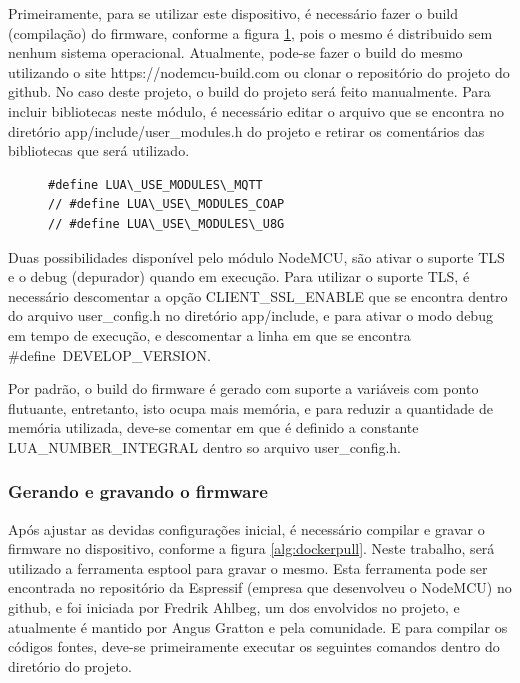 \documentclass[journal]{IEEEtran}
\begin{document}
Primeiramente, para se utilizar este dispositivo, é necessário fazer o build (compilação) do firmware, conforme a figura \ref{alg:modulesh}, pois o mesmo é distribuido sem nenhum sistema operacional. Atualmente, pode-se fazer o build do mesmo utilizando o site https://nodemcu-build.com ou clonar o repositório do projeto do github. No caso deste projeto, o build do projeto será feito manualmente. Para incluir bibliotecas neste módulo, é necessário editar o arquivo que se encontra no diretório app/include/user\_modules.h do projeto e retirar os comentários das bibliotecas que será utilizado.

\begin{figure}[h]
\centering

\begin{verbatim}
#define LUA\_USE_MODULES\_MQTT
// #define LUA\_USE\_MODULES_COAP
// #define LUA\_USE\_MODULES\_U8G
\end{verbatim}

\label{alg:modulesh}
\end{figure}



Duas possibilidades disponível pelo módulo NodeMCU, são ativar o suporte TLS e o debug (depurador) quando em execução. Para utilizar o suporte TLS, é necessário descomentar a opção CLIENT\_SSL\_ENABLE que se encontra dentro do arquivo user\_config.h no diretório app/include, e para ativar o modo debug em tempo de execução, e descomentar a linha em que se encontra \#define\ DEVELOP\_VERSION.

Por padrão, o build do firmware é gerado com suporte a variáveis com ponto flutuante, entretanto, isto ocupa mais memória, e para reduzir a quantidade de memória utilizada, deve-se comentar em que é definido a constante LUA\_NUMBER\_INTEGRAL dentro so arquivo user\_config.h.

\subsubsection{Gerando e gravando o firmware}

Após ajustar as devidas configurações inicial, é necessário compilar e gravar o firmware no dispositivo, conforme a figura \ref{alg:dockerpull}. Neste trabalho, será utilizado a ferramenta esptool para gravar o mesmo. Esta ferramenta pode ser encontrada no repositório da Espressif (empresa que desenvolveu o NodeMCU) no github, e foi iniciada por Fredrik Ahlbeg, um dos envolvidos no projeto, e atualmente é mantido por Angus Gratton e pela comunidade. E para compilar os códigos fontes, deve-se primeiramente executar os seguintes comandos dentro do diretório do projeto.
\end{document}
